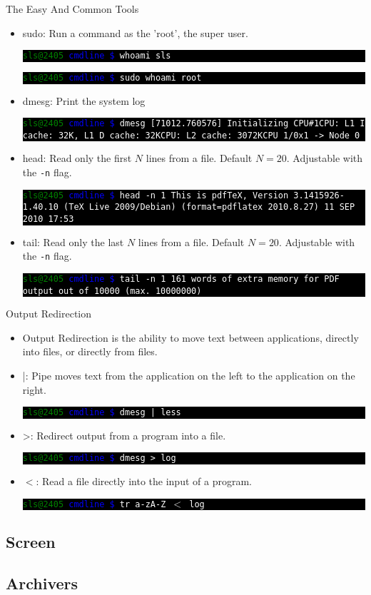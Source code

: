 \documentclass[10pt]{beamer}
\makeatletter
\newcommand{\codeblock}[1]
{
  \colorbox{black}{
    \begin{minipage}{\linewidth}
      \texttt{\textcolor{green}{sls@2405} \textcolor{blue}{cmdline \$} \textcolor{white}{#1}}
    \end{minipage}
  }
}
\newcommand{\codeblockWO}[2]
{
  \colorbox{black}{
    \begin{minipage}{\linewidth}
      \texttt{\textcolor{green}{sls@2405} \textcolor{blue}{cmdline \$} \textcolor{white}{#1}
      \newline
      \textcolor{white}{#2}}
    \end{minipage}
  }
}
\makeatother
\begin{document}
\begin{frame}[allowframebreaks]{The Easy And Common Tools}
\begin{itemize}
\item sudo: Run a command as the 'root', the super user.
\codeblockWO{whoami}{sls}
\codeblockWO{sudo whoami}{root}

\item dmesg: Print the system log
\codeblockWO{dmesg}{[71012.760576] Initializing CPU\#1\newline
[71012.760576] CPU: L1 I cache: 32K, L1 D cache: 32K\newline
[71012.760576] CPU: L2 cache: 3072K\newline
[71012.760576] CPU 1/0x1 -> Node 0}

\item head: Read only the first $N$ lines from a file. Default $N=20$. Adjustable with the \texttt{-n} flag.
\codeblockWO{head -n 1}{This is pdfTeX, Version 3.1415926-1.40.10 (TeX Live 2009/Debian) (format=pdflatex 2010.8.27)  11 SEP 2010 17:53}

\item tail: Read only the last $N$ lines from a file. Default $N=20$. Adjustable with the \texttt{-n} flag.
\codeblockWO{tail -n 1}{161 words of extra memory for PDF output out of 10000 (max. 10000000)}

\end{itemize}
\end{frame}

\begin{frame}{Output Redirection}
\begin{itemize}
\item Output Redirection is the ability to move text between applications, directly into files, or directly from files.

\item |: Pipe moves text from the application on the left to the application on the right.
\codeblock{dmesg | less}

\item >: Redirect output from a program into a file.
\codeblock{dmesg > log}

\item $<$: Read a file directly into the input of a program.
\codeblock{tr a-zA-Z $<$ log}
\end{itemize}
\end{frame}

\subsection{Screen}

\subsection{Archivers}
\end{document}
